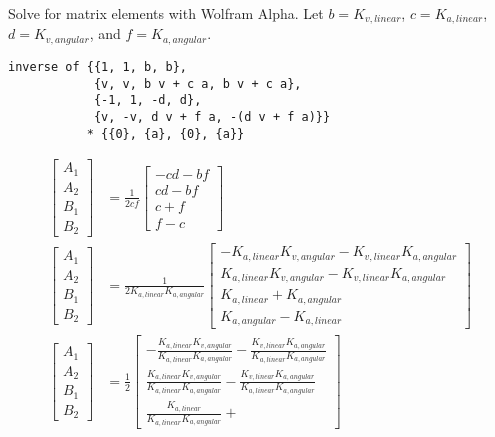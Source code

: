 Solve for matrix elements with Wolfram Alpha. Let
$b = K_{v,linear}$, $c = K_{a,linear}$, $d = K_{v,angular}$, and
$f = K_{a,angular}$.
\begin{verbatim}
inverse of {{1, 1, b, b},
            {v, v, b v + c a, b v + c a},
            {-1, 1, -d, d},
            {v, -v, d v + f a, -(d v + f a)}}
           * {{0}, {a}, {0}, {a}}
\end{verbatim}
\begin{align*}
  \begin{bmatrix}
    A_1 \\
    A_2 \\
    B_1 \\
    B_2
  \end{bmatrix} &= \frac{1}{2cf}
  \begin{bmatrix}
    -cd - bf \\
    cd - bf \\
    c + f \\
    f - c
  \end{bmatrix} \\
  \begin{bmatrix}
    A_1 \\
    A_2 \\
    B_1 \\
    B_2
  \end{bmatrix} &= \frac{1}{2 K_{a,linear} K_{a,angular}}
  \begin{bmatrix}
    -K_{a,linear} K_{v,angular} - K_{v,linear} K_{a,angular} \\
    K_{a,linear} K_{v,angular} - K_{v,linear} K_{a,angular} \\
    K_{a,linear} + K_{a,angular} \\
    K_{a,angular} - K_{a,linear}
  \end{bmatrix} \\
  \begin{bmatrix}
    A_1 \\
    A_2 \\
    B_1 \\
    B_2
  \end{bmatrix} &= \frac{1}{2}
  \begin{bmatrix}
    -\frac{K_{a,linear} K_{v,angular}}{K_{a,linear} K_{a,angular}} -
      \frac{K_{v,linear} K_{a,angular}}{K_{a,linear} K_{a,angular}} \\
    \frac{K_{a,linear} K_{v,angular}}{K_{a,linear} K_{a,angular}} -
      \frac{K_{v,linear} K_{a,angular}}{K_{a,linear} K_{a,angular}} \\
    \frac{K_{a,linear}}{K_{a,linear} K_{a,angular}} +

\end{bmatrix}
\end{align*}
